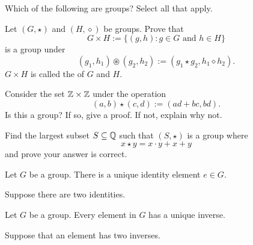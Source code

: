 \documentclass{ximera}
\begin{document}
\begin{exercise} %
  Which of the following are groups? Select all that apply.
  \begin{selectAll}
  \end{selectAll}
\end{exercise}

\begin{exercise}
  Let $(G,\star)$ and $(H,\diamond)$ be groups. Prove that
  \[
  G\times H := \{(g,h): \text{$g\in G$ and $h\in H$}\}
  \]
  is a group under
  \[
  (g_1,h_1) \circledast (g_2,h_2) := (g_1\star g_2, h_1\diamond h_2).
  \]
  $G\times H$ is called the  of $G$ and $H$.
\end{exercise}

\begin{exercise}
  Consider the set $\mathbb Z\times \mathbb Z$ under the operation
  \[
  (a,b) \star(c,d) := (ad+bc,bd).
  \]
  Is this a group? If so, give a proof. If not, explain why not.
\end{exercise}


\begin{exercise}
  Find the largest subset $S\subseteq \mathbb Q$ such that $(S,\star)$ is a
  group where
  \[
  x\star y = x\cdot y + x + y
  \]
  and prove your answer is correct.
\end{exercise}




\begin{lemma}
  Let $G$ be a group. There is a unique identity element $e\in G$.
  \begin{sketch}
    Suppose there are two identities.
  \end{sketch}
\end{lemma}


\begin{lemma}
  Let $G$ be a group. Every element in $G$ has a unique inverse.
  \begin{sketch}
    Suppose that an element has two inverses.
  \end{sketch}
\end{lemma}
\end{document}
